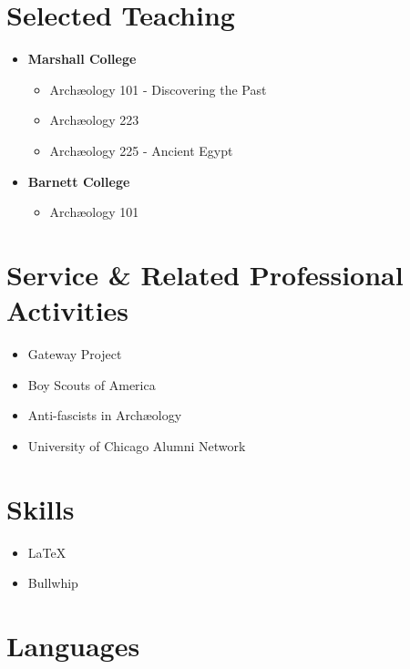 \documentclass[%
    11pt,
  oneside
  ]{memoir}
\let\oldsection\section
\renewcommand{\section}[1]{%
  \oldsection*{#1}
  \leavevmode
  \par
  \vspace{\dimexpr-\baselineskip-\parskip}
}
\begin{document}
\hypertarget{selected-teaching}{%
\section{Selected Teaching}\label{selected-teaching}}

\begin{itemize}
\tightlist
\item
  \textbf{Marshall College}

  \begin{itemize}
  \tightlist
  \item
    Archæology 101 - Discovering the Past
  \item
    Archæology 223
  \item
    Archæology 225 - Ancient Egypt
  \end{itemize}
\item
  \textbf{Barnett College}

  \begin{itemize}
  \tightlist
  \item
    Archæology 101
  \end{itemize}
\end{itemize}

\hypertarget{service-related-professional-activities}{%
\section{Service \& Related Professional
Activities}\label{service-related-professional-activities}}

\begin{itemize}
\tightlist
\item
  Gateway Project
\item
  Boy Scouts of America
\item
  Anti-fascists in Archæology
\item
  University of Chicago Alumni Network
\end{itemize}

\hypertarget{skills}{%
\section{Skills}\label{skills}}

\begin{itemize}
\tightlist
\item
  \LaTeX
\item
  Bullwhip
\end{itemize}

\hypertarget{languages}{%
\section{Languages}\label{languages}}
\end{document}
